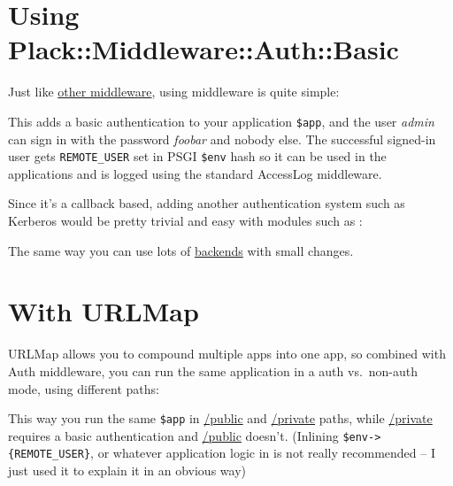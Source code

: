 \section{Using
Plack::Middleware::Auth::Basic}\label{using-plackmiddlewareauthbasic}

Just like
\href{http://advent.plackperl.org/2009/12/day-10-using-plack-middleware.html}{other
middleware}, using  middleware is quite simple:


This adds a basic authentication to your application \lstinline!$app!,
and the user \emph{admin} can sign in with the password \emph{foobar}
and nobody else. The successful signed-in user gets
\lstinline!REMOTE_USER! set in PSGI \lstinline!$env! hash so it can be
used in the applications and is logged using the standard AccessLog
middleware.

Since it's a callback based, adding another authentication system such
as Kerberos would be pretty trivial and easy with modules such as
:


The same way you can use lots of
\href{http://search.cpan.org/search?query=authen+simple\&mode=all}{
backends} with small changes.

\section{With URLMap}\label{with-urlmap}

URLMap allows you to compound multiple apps into one app, so combined
with Auth middleware, you can run the same application in a auth
vs.~non-auth mode, using different paths:


This way you run the same \lstinline!$app! in \url{/public} and
\url{/private} paths, while \url{/private} requires a basic authentication
and \url{/public} doesn't. (Inlining \lstinline!$env->{REMOTE_USER}!, or
whatever application logic in  is not really recommended -- I just
used it to explain it in an obvious way)

